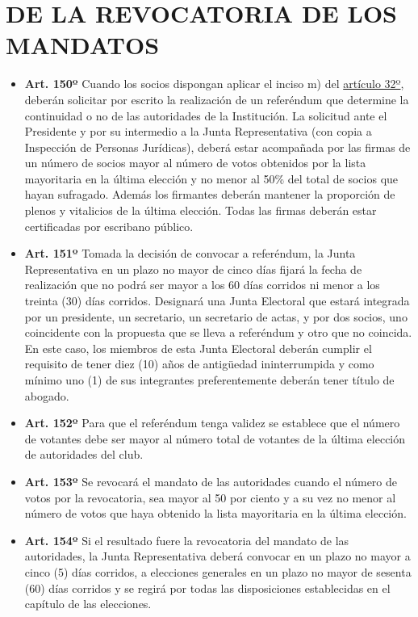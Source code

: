 \documentclass[]{book}
\begin{document}
\chapter{DE LA REVOCATORIA DE LOS
MANDATOS}\label{de-la-revocatoria-de-los-mandatos}

\begin{itemize}
\item
  \textbf{Art. 150º} Cuando los socios dispongan aplicar el inciso m)
  del \protect\hyperlink{art32}{artículo 32º}, deberán solicitar por
  escrito la realización de un referéndum que determine la continuidad o
  no de las autoridades de la Institución. La solicitud ante el
  Presidente y por su intermedio a la Junta Representativa (con copia a
  Inspección de Personas Jurídicas), deberá estar acompañada por las
  firmas de un número de socios mayor al número de votos obtenidos por
  la lista mayoritaria en la última elección y no menor al 50\% del
  total de socios que hayan sufragado. Además los firmantes deberán
  mantener la proporción de plenos y vitalicios de la última elección.
  Todas las firmas deberán estar certificadas por escribano público.
\item
  \textbf{Art. 151º} Tomada la decisión de convocar a referéndum, la
  Junta Representativa en un plazo no mayor de cinco días fijará la
  fecha de realización que no podrá ser mayor a los 60 días corridos ni
  menor a los treinta (30) días corridos. Designará una Junta Electoral
  que estará integrada por un presidente, un secretario, un secretario
  de actas, y por dos socios, uno coincidente con la propuesta que se
  lleva a referéndum y otro que no coincida. En este caso, los miembros
  de esta Junta Electoral deberán cumplir el requisito de tener diez
  (10) años de antigüedad ininterrumpida y como mínimo uno (1) de sus
  integrantes preferentemente deberán tener título de abogado.
\item
  \textbf{Art. 152º} Para que el referéndum tenga validez se establece
  que el número de votantes debe ser mayor al número total de votantes
  de la última elección de autoridades del club.
\item
  \textbf{Art. 153º} Se revocará el mandato de las autoridades cuando el
  número de votos por la revocatoria, sea mayor al 50 por ciento y a su
  vez no menor al número de votos que haya obtenido la lista mayoritaria
  en la última elección.
\item
  \textbf{Art. 154º} Si el resultado fuere la revocatoria del mandato de
  las autoridades, la Junta Representativa deberá convocar en un plazo
  no mayor a cinco (5) días corridos, a elecciones generales en un plazo
  no mayor de sesenta (60) días corridos y se regirá por todas las
  disposiciones establecidas en el capítulo de las elecciones.
\end{itemize}
\end{document}
